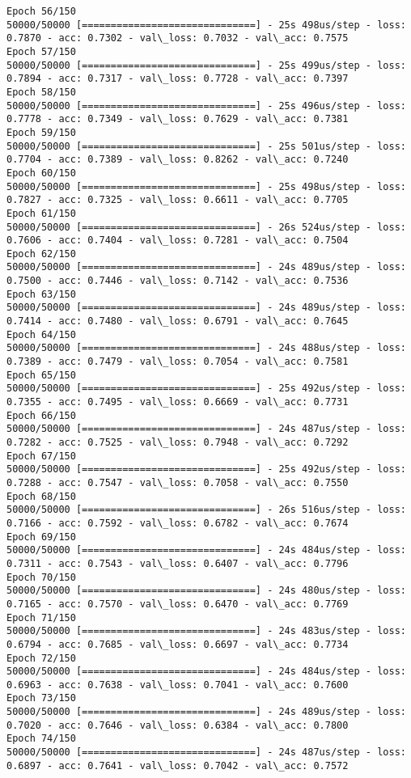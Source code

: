 \documentclass[11pt]{article}
\begin{document}
\begin{Verbatim}[commandchars=\\\{\}]
Epoch 56/150
50000/50000 [==============================] - 25s 498us/step - loss: 0.7870 - acc: 0.7302 - val\_loss: 0.7032 - val\_acc: 0.7575
Epoch 57/150
50000/50000 [==============================] - 25s 499us/step - loss: 0.7894 - acc: 0.7317 - val\_loss: 0.7728 - val\_acc: 0.7397
Epoch 58/150
50000/50000 [==============================] - 25s 496us/step - loss: 0.7778 - acc: 0.7349 - val\_loss: 0.7629 - val\_acc: 0.7381
Epoch 59/150
50000/50000 [==============================] - 25s 501us/step - loss: 0.7704 - acc: 0.7389 - val\_loss: 0.8262 - val\_acc: 0.7240
Epoch 60/150
50000/50000 [==============================] - 25s 498us/step - loss: 0.7827 - acc: 0.7325 - val\_loss: 0.6611 - val\_acc: 0.7705
Epoch 61/150
50000/50000 [==============================] - 26s 524us/step - loss: 0.7606 - acc: 0.7404 - val\_loss: 0.7281 - val\_acc: 0.7504
Epoch 62/150
50000/50000 [==============================] - 24s 489us/step - loss: 0.7500 - acc: 0.7446 - val\_loss: 0.7142 - val\_acc: 0.7536
Epoch 63/150
50000/50000 [==============================] - 24s 489us/step - loss: 0.7414 - acc: 0.7480 - val\_loss: 0.6791 - val\_acc: 0.7645
Epoch 64/150
50000/50000 [==============================] - 24s 488us/step - loss: 0.7389 - acc: 0.7479 - val\_loss: 0.7054 - val\_acc: 0.7581
Epoch 65/150
50000/50000 [==============================] - 25s 492us/step - loss: 0.7355 - acc: 0.7495 - val\_loss: 0.6669 - val\_acc: 0.7731
Epoch 66/150
50000/50000 [==============================] - 24s 487us/step - loss: 0.7282 - acc: 0.7525 - val\_loss: 0.7948 - val\_acc: 0.7292
Epoch 67/150
50000/50000 [==============================] - 25s 492us/step - loss: 0.7288 - acc: 0.7547 - val\_loss: 0.7058 - val\_acc: 0.7550
Epoch 68/150
50000/50000 [==============================] - 26s 516us/step - loss: 0.7166 - acc: 0.7592 - val\_loss: 0.6782 - val\_acc: 0.7674
Epoch 69/150
50000/50000 [==============================] - 24s 484us/step - loss: 0.7311 - acc: 0.7543 - val\_loss: 0.6407 - val\_acc: 0.7796
Epoch 70/150
50000/50000 [==============================] - 24s 480us/step - loss: 0.7165 - acc: 0.7570 - val\_loss: 0.6470 - val\_acc: 0.7769
Epoch 71/150
50000/50000 [==============================] - 24s 483us/step - loss: 0.6794 - acc: 0.7685 - val\_loss: 0.6697 - val\_acc: 0.7734
Epoch 72/150
50000/50000 [==============================] - 24s 484us/step - loss: 0.6963 - acc: 0.7638 - val\_loss: 0.7041 - val\_acc: 0.7600
Epoch 73/150
50000/50000 [==============================] - 24s 489us/step - loss: 0.7020 - acc: 0.7646 - val\_loss: 0.6384 - val\_acc: 0.7800
Epoch 74/150
50000/50000 [==============================] - 24s 487us/step - loss: 0.6897 - acc: 0.7641 - val\_loss: 0.7042 - val\_acc: 0.7572

\end{Verbatim}
\end{document}
